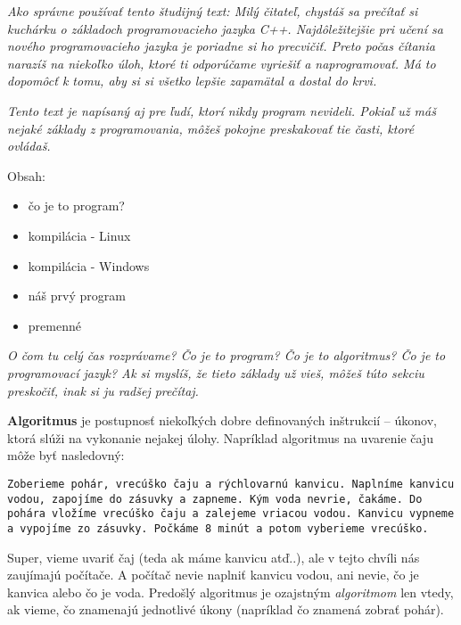 




\textit{Ako správne používať tento študijný text: Milý čitateľ, chystáš sa
prečítať si kuchárku o základoch programovacieho jazyka C++. Najdôležitejšie
pri učení sa nového programovacieho jazyka je poriadne si ho precvičiť. Preto
počas čítania narazíš na niekoľko úloh, ktoré ti odporúčame vyriešiť a
naprogramovať.  Má to dopomôcť k tomu, aby si si všetko lepšie zapamätal a dostal
do krvi.}

\textit{Tento text je napísaný aj pre ľudí, ktorí nikdy program nevideli. Pokiaľ
už máš nejaké základy z programovania, môžeš pokojne preskakovať tie časti,
ktoré ovládaš.}

Obsah:
\begin{itemize}
    \item čo je to program?
    \item kompilácia - Linux
    \item kompilácia - Windows %
    \item náš prvý program
    \item premenné
\end{itemize}

\medskip

 \textit{O čom tu celý čas rozprávame? Čo je to program? Čo
je to algoritmus? Čo je to programovací jazyk?  Ak si myslíš, že tieto základy
už vieš, môžeš túto sekciu preskočiť, inak si ju radšej prečítaj.}

\textbf{Algoritmus} je postupnosť niekoľkých dobre definovaných inštrukcií --
úkonov, ktorá slúži na vykonanie nejakej úlohy.  Napríklad algoritmus na
uvarenie čaju môže byť nasledovný:

\texttt{Zoberieme pohár, vrecúško čaju a rýchlovarnú kanvicu. Naplníme kanvicu
vodou, zapojíme do zásuvky a zapneme. Kým voda nevrie, čakáme.  Do pohára
vložíme vrecúško čaju a zalejeme vriacou vodou. Kanvicu vypneme a vypojíme zo
zásuvky. Počkáme 8 minút a potom vyberieme vrecúško.}

Super, vieme uvariť čaj (teda ak máme kanvicu atď..), ale v tejto chvíli nás
zaujímajú počítače. A počítač nevie naplniť kanvicu vodou, ani nevie, čo je
kanvica alebo čo je voda. Predošlý algoritmus je ozajstným \emph{algoritmom}
len vtedy, ak vieme, čo znamenajú jednotlivé úkony (napríklad čo znamená zobrať
pohár). 

